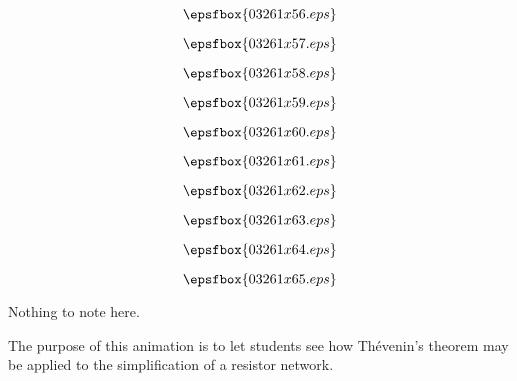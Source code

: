 \vfil \eject
$$\epsfbox{03261x56.eps}$$

\vfil \eject
$$\epsfbox{03261x57.eps}$$

\vfil \eject
$$\epsfbox{03261x58.eps}$$

\vfil \eject
$$\epsfbox{03261x59.eps}$$

\vfil \eject
$$\epsfbox{03261x60.eps}$$

\vfil \eject
$$\epsfbox{03261x61.eps}$$

\vfil \eject
$$\epsfbox{03261x62.eps}$$

\vfil \eject
$$\epsfbox{03261x63.eps}$$

\vfil \eject
$$\epsfbox{03261x64.eps}$$

\vfil \eject
$$\epsfbox{03261x65.eps}$$


\vfil \eject







Nothing to note here.







The purpose of this animation is to let students see how Th\'evenin's theorem may be applied to the simplification of a resistor network.




